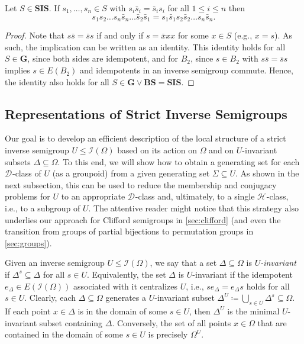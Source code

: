 \documentclass[anonymous,letter,UKenglish,cleveref,autoref,thm-restate]{lipics-v2021}
\renewcommand{\leq}{\leqslant}
\newcommand{\sse}{\subseteq}
\newcommand{\vG}{\ensuremath{\mathbf{G}}}
\newcommand{\vSI}{\ensuremath{\mathbf{SIS}}}
\newcommand{\vBS}{\ensuremath{\mathbf{BS}}}  \newcommand{\vBM}{\ensuremath{\mathbf{BM}}}
\newcommand{\ISym}{\cI}
\newcommand*{\gH}[1][]{\mathrel{\mathcal{H}_{#1}}}
\newcommand*{\gD}[1][]{\mathrel{\mathcal{D}_{#1}}}
\newcommand{\cI}{\mathcal{I}}
\theoremstyle{plain}
\theoremstyle{plain}
\begin{document}
\begin{lemma}\label{lem:gb-idempotent_nesting}
	Let $S \in \vSI$.
	If $s_1, \dotsc, s_n \in S$ with $s_i \bar s_i = \bar s_i s_i$ for all $1 \leq i \leq n$ then 
	\[
	s_1 s_2 \dotsc s_n \bar s_n \dotsc \bar s_2 \bar s_1 = s_1 \bar s_1 s_2 \bar s_2 \dotsc s_n \bar s_n.
	\]
\end{lemma}
\begin{proof}
	Note that $s \bar s = \bar s s$ if and only if $s = \bar x x x$ for some $x \in S$ (e.g., $x=s$).
	As such, the implication can be written as an identity.
	This identity holds for all $S \in \vG$, since both sides are idempotent, and for $B_2$, since $s \in B_2$ with $s \bar s = \bar s s$ implies $s \in E(B_2)$ and idempotents in an inverse semigroup commute.
	Hence, the identity also holds for all $S \in \vG \vee \vBS = \vSI$.
\end{proof}



\subsection{Representations of Strict Inverse Semigroups}\label{sub:munn}

Our goal is to develop an efficient description of the local structure of a strict inverse semigroup $U \leq \ISym(\Omega)$ based on its action on $\Omega$ and on $U$-invariant subsets $\Delta \sse \Omega$.
To this end, we will show how to obtain a generating set for each $\gD$-class of $U$ (as a groupoid) from a given generating set $\Sigma \sse U$.
As shown in the next subsection, this can be used to reduce the membership and conjugacy problems for $U$ to an appropriate $\gD$-class and, ultimately, to a single $\gH$-class, i.e., to a subgroup of $U$.
The attentive reader might notice that this strategy also underlies our approach for Clifford semigroups in \cref{sec:clifford} (and even the transition from groups of partial bijections to permutation groups in \cref{sec:groups}).

Given an inverse semigroup $U \leq \ISym(\Omega)$, we say that a set $\Delta \sse \Omega$ is \emph{$U$-invariant} if $\Delta^s \sse \Delta$ for all $s \in U$.
Equivalently, the set $\Delta$ is $U$-invariant if the idempotent $e_\Delta \in E(\ISym(\Omega))$ associated with it centralizes $U$, i.e., $s e_\Delta = e_\Delta s$ holds for all $s \in U$.
Clearly, each $\Delta \sse \Omega$ generates a $U$-invariant subset $\Delta^U \coloneqq \bigcup_{s \in U} \Delta^s \sse \Omega$.
If each point $x \in \Delta$ is in the domain of some $s \in U$, then $\Delta^U$ is the minimal $U$-invariant subset containing $\Delta$.
Conversely, the set of all points $x \in \Omega$ that are contained in the domain of some $s \in U$ is precisely $\Omega^U$.
\end{document}
